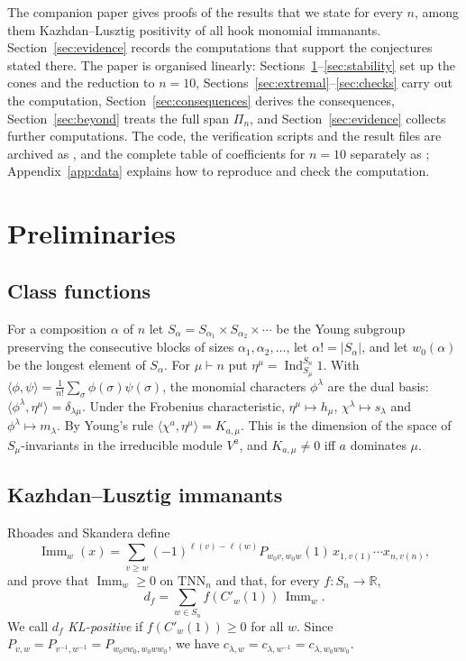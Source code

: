 \documentclass[11pt]{amsart}
\theoremstyle{definition}
\theoremstyle{remark}
\newcommand{\R}{\mathbb{R}}
\newcommand{\Imm}{\operatorname{Imm}}
\newcommand{\TNN}{\mathrm{TNN}}
\newcommand{\Ind}{\operatorname{Ind}}
\newcommand{\Cp}[1]{C'_{#1}(1)}
\begin{document}
The companion paper \cite{McN} gives proofs of the results that we state for every $n$, among them Kazhdan--Lusztig positivity of all hook monomial immanants. Section~\ref{sec:evidence} records the computations that support the conjectures stated there. The paper is organised linearly: Sections~\ref{sec:prelim}--\ref{sec:stability} set up the cones and the reduction to $n=10$, Sections~\ref{sec:extremal}--\ref{sec:checks} carry out the computation, Section~\ref{sec:consequences} derives the consequences, Section~\ref{sec:beyond} treats the full span $\Pi_n$, and Section~\ref{sec:evidence} collects further computations. The code, the verification scripts and the result files are archived as \cite{McNcode}, and the complete table of coefficients for $n=10$ separately as \cite{McNdata}; Appendix~\ref{app:data} explains how to reproduce and check the computation.

\section{Preliminaries}\label{sec:prelim}

\subsection{Class functions}
For a composition $\alpha$ of $n$ let $S_\alpha=S_{\alpha_1}\times S_{\alpha_2}\times\cdots$ be the Young subgroup preserving the consecutive blocks of sizes $\alpha_1,\alpha_2,\dots$, let $\alpha!=|S_\alpha|$, and let $w_0(\alpha)$ be the longest element of $S_\alpha$. For $\mu\vdash n$ put $\eta^\mu=\Ind_{S_\mu}^{S_n}1$. With $\langle\phi,\psi\rangle=\frac1{n!}\sum_\sigma\phi(\sigma)\psi(\sigma)$, the monomial characters $\phi^\lambda$ are the dual basis: $\langle\phi^\lambda,\eta^\mu\rangle=\delta_{\lambda\mu}$. Under the Frobenius characteristic, $\eta^\mu\mapsto h_\mu$, $\chi^\lambda\mapsto s_\lambda$ and $\phi^\lambda\mapsto m_\lambda$. By Young's rule $\langle\chi^a,\eta^\mu\rangle=K_{a,\mu}$. This is the dimension of the space of $S_\mu$-invariants in the irreducible module $V^a$, and $K_{a,\mu}\ne0$ iff $a$ dominates $\mu$.

\subsection{Kazhdan--Lusztig immanants}
Rhoades and Skandera \cite{RS06} define
\[
  \Imm_w(x)=\sum_{v\ge w}(-1)^{\ell(v)-\ell(w)}P_{w_0v,w_0w}(1)\,x_{1,v(1)}\cdots x_{n,v(n)},
\]
and prove that $\Imm_w\ge0$ on $\TNN_n$ and that, for every $f\colon S_n\to\R$,
\begin{equation}\label{eq:duality}
  d_f=\sum_{w\in S_n}f(\Cp w)\,\Imm_w .
\end{equation}
We call $d_f$ \emph{KL-positive} if $f(\Cp w)\ge0$ for all $w$. Since $P_{v,w}=P_{v^{-1},w^{-1}}=P_{w_0vw_0,w_0ww_0}$, we have $c_{\lambda,w}=c_{\lambda,w^{-1}}=c_{\lambda,w_0ww_0}$.
\end{document}
